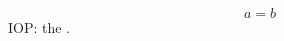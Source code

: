 \documentclass{iopart}
\begin{document}
\begin{equation} a=b \label{anomaly condition} \end{equation}
IOP: the .
\end{document}
